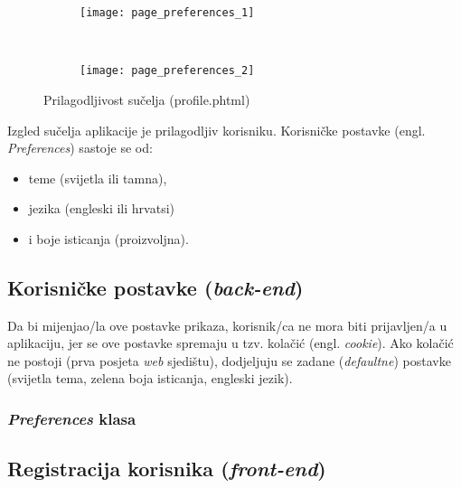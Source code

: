       \begin{figure}[h]
        \begin{center}
          \begin{subfigure}{0.65\textwidth}
            \texttt{[image: page\_preferences\_1]}
          \end{subfigure}
          \\
          \begin{subfigure}{0.65\textwidth}
            \texttt{[image: page\_preferences\_2]}
          \end{subfigure}

          \caption{Prilagodljivost sučelja (profile.phtml)}
        \end{center}
      \end{figure}

      Izgled sučelja aplikacije je prilagodljiv korisniku.
      Korisničke postavke (engl. \textit{Preferences}) sastoje se od:

      \begin{itemize}
        \item teme (svijetla ili tamna),
        \item jezika (engleski ili hrvatsi)
        \item i boje isticanja (proizvoljna).
      \end{itemize}


    \subsection{Korisničke postavke (\textit{back-end})}

      Da bi mijenjao/la ove postavke prikaza, korisnik/ca ne mora biti
      prijavljen/a u aplikaciju, jer se ove postavke spremaju u tzv. kolačić
      (engl. \textit{cookie}). Ako kolačić ne postoji (prva posjeta \textit{web}
      sjedištu), dodjeljuju se zadane (\textit{defaultne}) postavke (svijetla
      tema, zelena boja isticanja, engleski jezik).

      \subsubsection{\textit{Preferences} klasa}

        

  \subsection{Registracija korisnika (\textit{front-end})}

